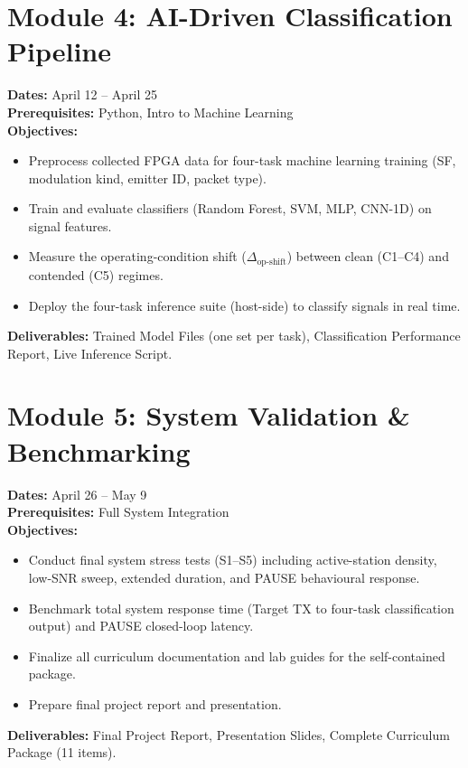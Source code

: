 \documentclass[11pt,letterpaper]{article}
\begin{document}
\section{Module 4: AI-Driven Classification Pipeline}
\textbf{Dates:} April 12 -- April 25 \\
\textbf{Prerequisites:} Python, Intro to Machine Learning \\
\textbf{Objectives:}
\begin{itemize}[noitemsep]
    \item Preprocess collected FPGA data for four-task machine learning training (SF, modulation kind, emitter ID, packet type).
    \item Train and evaluate classifiers (Random Forest, SVM, MLP, CNN-1D) on signal features.
    \item Measure the operating-condition shift ($\Delta_{\text{op-shift}}$) between clean (C1--C4) and contended (C5) regimes.
    \item Deploy the four-task inference suite (host-side) to classify signals in real time.
\end{itemize}
\textbf{Deliverables:} Trained Model Files (one set per task), Classification Performance Report, Live Inference Script.

\section{Module 5: System Validation \& Benchmarking}
\textbf{Dates:} April 26 -- May 9 \\
\textbf{Prerequisites:} Full System Integration \\
\textbf{Objectives:}
\begin{itemize}[noitemsep]
    \item Conduct final system stress tests (S1--S5) including active-station density, low-SNR sweep, extended duration, and PAUSE behavioural response.
    \item Benchmark total system response time (Target TX to four-task classification output) and PAUSE closed-loop latency.
    \item Finalize all curriculum documentation and lab guides for the self-contained package.
    \item Prepare final project report and presentation.
\end{itemize}
\textbf{Deliverables:} Final Project Report, Presentation Slides, Complete Curriculum Package (11 items).
\end{document}
